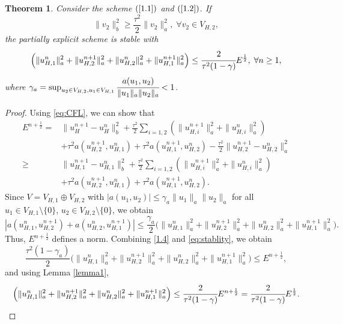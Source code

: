 \documentclass[preprint,12pt]{elsarticle}
\newtheorem{theorem}{Theorem}
\begin{document}
\begin{theorem}
    Consider the scheme $(\ref{1.1})$ and $(\ref{1.2})$. If \begin{equation}\label{eq:CFL}
        \|v_{2}\|_b^2 \geqslant \frac{\tau^2}{2}\|v_{2}\|_{a}^2, \; \forall v_{2}\in V_{H,2},
    \end{equation} the partially explicit scheme is stable with $$\Big(\|u_{H,1}^{n}\|_a^2+\|u_{H,2}^{n+1}\|_a^2+\|u_{H,2}^{n}\|_a^2+\|u_{H,1}^{n+1}\|_a^2\Big)\leq \cfrac{2}{\tau^2(1-\gamma)}E^{\frac{1}{2}},\; \forall n\geq 1,$$
    where $\gamma_a = \sup_{u_2\in V_{H,2},u_1\in V_{H,1}}\cfrac{a(u_1,u_2)}{\|u_1\|_a\|u_2\|_a}<1$.
\end{theorem}
\begin{proof}
    Using \eqref{eq:CFL}, we can show that
\begin{equation}\label{1.4}
\begin{aligned}
     E^{n+\frac{1}{2}}=&\|u_{H}^{n+1}-u_{H}^{n}\|_{b}^2+\frac{\tau^2}{2}\sum_{i=1,2}\left(\|u_{H,i}^{n+1}\|_{a}^2+\|u_{H,i}^{n}\|_{a}^2\right)\\
     &+\tau^2 a(u_{H,2}^{n+1},u_{H,1}^{n})+\tau^2 a(u_{H,1}^{n+1},u_{H,2}^{n})-\frac{\tau^2}{2}\|u_{H,2}^{n+1}-u_{H,2}^{n}\|_{a}^2\\
     \geqslant&\|u_{H,1}^{n+1}-u_{H,1}^{n}\|_{b}^2+\frac{\tau^2}{2}\sum_{i=1,2}\left(\|u_{H,i}^{n+1}\|_{a}^2+\|u_{H,i}^{n}\|_{a}^2\right)\\
     &+\tau^2 a(u_{H,2}^{n+1},u_{H,1}^{n})+\tau^2 a(u_{H,1}^{n+1},u_{H,2}^{n}).
\end{aligned}
\end{equation}
Since $V=V_{H,1}\oplus V_{H,2}$ with $|a(u_1,u_2)|\leq \gamma_a\|u_1\|_a\|u_2\|_a$ for all $u_1\in V_{H,1}\setminus \{0\}$, $u_2\in V_{H,2}\setminus\{0\} $, we obtain
\begin{equation}\label{eq:stablity}
    |a(u_{H,1}^{n},u_{H,2}^{n+1})+a(u_{H,2}^{n},u_{H,1}^{n+1})|\leq \frac{\gamma_a}{2}\Big(\|u_{H,1}^{n}\|_a^2+\|u_{H,2}^{n+1}\|_a^2+\|u_{H,2}^{n}\|_a^2+\|u_{H,1}^{n+1}\|_a^2\Big).
\end{equation}
Thus, $E^{n+\frac{1}{2}}$ defines a norm. Combining \eqref{1.4} and \eqref{eq:stablity}, we obtain
$$ \frac{\tau^2(1-\gamma_a)}{2}\Big(\|u_{H,1}^{n}\|_a^2+\|u_{H,2}^{n+1}\|_a^2+\|u_{H,2}^{n}\|_a^2+\|u_{H,1}^{n+1}\|_a^2\Big)\leq E^{n+\frac{1}{2}},$$
and using Lemma \ref{lemma1},
$$\Big(\|u_{H,1}^{n}\|_a^2+\|u_{H,2}^{n+1}\|_a^2+\|u_{H,2}^{n}\|_a^2+\|u_{H,1}^{n+1}\|_a^2\Big)\leq  \cfrac{2}{\tau^2(1-\gamma)}E^{n+\frac{1}{2}}=\cfrac{2}{\tau^2(1-\gamma)}E^{\frac{1}{2}}.$$
\end{proof}    
\end{document}
